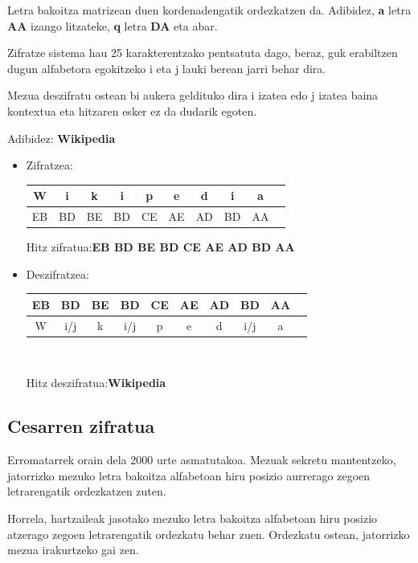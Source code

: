 \documentclass[12pt]{basque-book}
\begin{document}
Letra bakoitza matrizean duen kordenadengatik ordezkatzen da. Adibidez, \textbf{a} letra \textbf{AA} izango litzateke, \textbf{q} letra \textbf{DA} eta abar.

Zifratze sistema hau 25 karakterentzako pentsatuta dago, beraz, guk erabiltzen dugun alfabetora egokitzeko i eta j lauki berean jarri behar dira.

Mezua deszifratu ostean bi aukera geldituko dira i izatea edo j izatea baina kontextua eta hitzaren esker ez da dudarik egoten.

Adibidez: \textbf{Wikipedia}
\begin{itemize}
    \item Zifratzea:
    \begin{center}
        \begin{tabular}{c|c|c|c|c|c|c|c|c|c|}
             W & i & k & i & p & e & d & i & a\\ 
             \hline
             EB & BD & BE & BD & CE & AE & AD & BD & AA
        \end{tabular}
    \end{center}
    \begin{center}
        Hitz zifratua:\textbf{EB BD BE BD CE AE AD BD AA}
    \end{center}
    \item Deszifratzea:
    \begin{center}
        \begin{tabular}{c|c|c|c|c|c|c|c|c|c|}
            EB & BD & BE & BD & CE & AE & AD & BD & AA\\
            \hline
            W & i/j & k & i/j & p & e & d & i/j & a\\ 
        \end{tabular}
        \\
    \end{center}
    \begin{center}
         Hitz deszifratua:\textbf{Wikipedia}
    \end{center}
\end{itemize}


\subsection{Cesarren zifratua} 
Erromatarrek orain dela 2000 urte asmatutakoa.
Mezuak sekretu mantentzeko, jatorrizko mezuko letra bakoitza alfabetoan hiru posizio aurrerago zegoen letrarengatik ordezkatzen zuten.

Horrela, hartzaileak jasotako mezuko letra bakoitza alfabetoan hiru posizio atzerago zegoen letrarengatik ordezkatu behar zuen. Ordezkatu ostean, jatorrizko mezua irakurtzeko gai zen.
\end{document}
